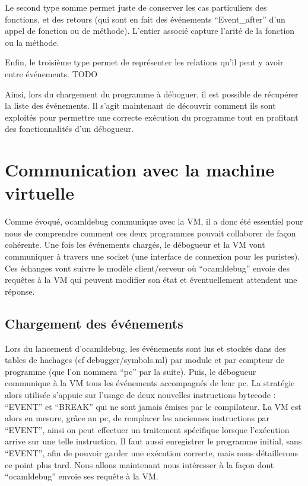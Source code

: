 \documentclass[11pt,a4paper]{report}
\begin{document}
\smallskip

Le second type somme permet juste de conserver les cas particuliers des fonctions, et des retours (qui sont en fait des événements ``Event\_after'' d'un appel de fonction ou de méthode). L'entier associé capture l'arité de la fonction ou la méthode.

\smallskip

Enfin, le troisième type permet de représenter les relations qu'il peut y avoir entre événements. TODO




\bigskip

Ainsi, lors du chargement du programme à déboguer, il est possible de récupérer la liste des événements. Il s'agit maintenant de découvrir comment ils sont exploités pour permettre une correcte exécution du programme tout en profitant des fonctionnalités d'un débogueur.

\section{Communication avec la machine virtuelle}

Comme évoqué, ocamldebug communique avec la VM, il a donc été essentiel pour nous de comprendre comment ces deux programmes pouvait collaborer de façon cohérente. Une fois les événements chargés, le débogueur et la VM vont communiquer à travers une socket (une interface de connexion pour les puristes). Ces échanges vont suivre le modèle client/serveur où ``ocamldebug'' envoie des requêtes à la VM qui peuvent modifier son état et éventuellement attendent une réponse.


\medskip

\subsection{Chargement des événements}

Lors du lancement d'ocamldebug, les événements sont lus et stockés dans des tables de hachages (cf debugger/symbols.ml) par module et par compteur de programme (que l'on nommera ``pc'' par la suite). Puis, le débogueur communique à la VM tous les événements accompagnés de leur pc. La stratégie alors utilisée s'appuie sur l'usage de deux nouvelles instructions bytecode : ``EVENT'' et ``BREAK''
qui ne sont jamais émises par le compilateur. La VM est alors en mesure, grâce au pc, de remplacer les anciennes instructions par ``EVENT'', ainsi on peut effectuer un traitement spécifique lorsque l'exécution arrive sur une telle instruction. Il faut aussi enregistrer le programme initial, sans ``EVENT'', afin de pouvoir garder une exécution correcte, mais nous détaillerons ce point plus tard. Nous allons maintenant nous intéresser à la façon dont ``ocamldebug'' envoie ses requête à la VM.
\end{document}
